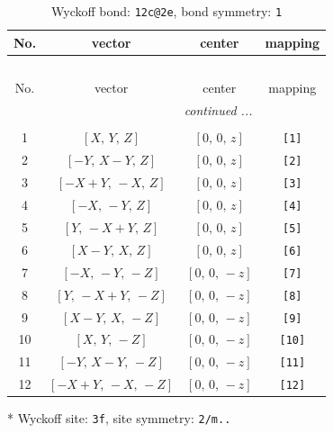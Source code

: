 \documentclass[fleqn,8pt]{jsarticle}
\begin{document}
\renewcommand{\arraystretch}{1.2}
\begin{longtable}{cccc}
\caption{Wyckoff bond: {\tt 12c@2e}, bond symmetry: {\tt 1}}
 \\
 \hline \hline
No. & vector & center & mapping \\ \hline \endfirsthead

\multicolumn{3}{l}{\tablename\ \thetable{}} \\
 \hline \hline
No. & vector & center & mapping \\ \hline \endhead

 \hline \hline
\multicolumn{3}{r}{\footnotesize\it continued ...} \\ \endfoot

 \hline \hline
\multicolumn{3}{r}{} \\ \endlastfoot

1 & $\left[ X,\, Y,\, Z \right]$ & $\left[ 0,\, 0,\, z \right]$ & {\tt [1]} \\ \hline
2 & $\left[ - Y,\, X - Y,\, Z \right]$ & $\left[ 0,\, 0,\, z \right]$ & {\tt [2]} \\ \hline
3 & $\left[ - X + Y,\, - X,\, Z \right]$ & $\left[ 0,\, 0,\, z \right]$ & {\tt [3]} \\ \hline
4 & $\left[ - X,\, - Y,\, Z \right]$ & $\left[ 0,\, 0,\, z \right]$ & {\tt [4]} \\ \hline
5 & $\left[ Y,\, - X + Y,\, Z \right]$ & $\left[ 0,\, 0,\, z \right]$ & {\tt [5]} \\ \hline
6 & $\left[ X - Y,\, X,\, Z \right]$ & $\left[ 0,\, 0,\, z \right]$ & {\tt [6]} \\ \hline
7 & $\left[ - X,\, - Y,\, - Z \right]$ & $\left[ 0,\, 0,\, - z \right]$ & {\tt [7]} \\ \hline
8 & $\left[ Y,\, - X + Y,\, - Z \right]$ & $\left[ 0,\, 0,\, - z \right]$ & {\tt [8]} \\ \hline
9 & $\left[ X - Y,\, X,\, - Z \right]$ & $\left[ 0,\, 0,\, - z \right]$ & {\tt [9]} \\ \hline
10 & $\left[ X,\, Y,\, - Z \right]$ & $\left[ 0,\, 0,\, - z \right]$ & {\tt [10]} \\ \hline
11 & $\left[ - Y,\, X - Y,\, - Z \right]$ & $\left[ 0,\, 0,\, - z \right]$ & {\tt [11]} \\ \hline
12 & $\left[ - X + Y,\, - X,\, - Z \right]$ & $\left[ 0,\, 0,\, - z \right]$ & {\tt [12]} \\
\end{longtable}
* Wyckoff site: {\tt 3f}, site symmetry: {\tt 2/m..}
\renewcommand{\arraystretch}{1.2}
\end{document}
